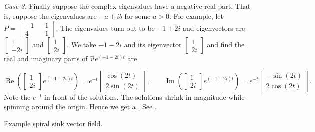 \documentclass{ximera}
\begin{document}
\medskip

\emph{Case 3.} Finally suppose the complex eigenvalues have a negative real part.  That is, suppose the eigenvalues are $-a \pm ib$ for some $a > 0$. For example, let $P = \left[ \begin{smallmatrix} -1 & -1 \\ 4 & -1 \end{smallmatrix} \right]$. The eigenvalues turn out to be $-1\pm 2i$ and eigenvectors are $\left[ \begin{smallmatrix} 1 \\ -2i \end{smallmatrix} \right]$ and $\left[ \begin{smallmatrix} 1 \\ 2i \end{smallmatrix} \right]$.  We take $-1 - 2i$ and its eigenvector $\left[ \begin{smallmatrix} 1 \\ 2i \end{smallmatrix} \right]$ and find the real and imaginary parts of $\vec{v} e^{(-1-2i)t}$ are

\begin{equation*}
    \operatorname{Re}\left(
    \begin{bmatrix} 
        1 \\ 
        2i 
    \end{bmatrix} 
    e^{(-1-2i)t}\right) = e^{-t}
    \begin{bmatrix} 
        \cos (2t) \\ 
        2 \sin (2t)  
    \end{bmatrix} ,
    \qquad \operatorname{Im}\left(
    \begin{bmatrix} 
        1 \\ 
        2i 
    \end{bmatrix} 
    e^{(-1-2i)t}\right) = e^{-t} 
    \begin{bmatrix} 
        -\sin (2t) \\ 
        2 \cos (2t) 
    \end{bmatrix} .
\end{equation*}
Note the $e^{-t}$ in front of the solutions.  The solutions shrink in magnitude while spinning around the origin.  Hence we get a \emph{}. See .

\begin{myfig}
    \capstart
    \caption{Example spiral sink vector field.\label{pln:spiral-sinkfig}}
\end{myfig}
\end{document}
